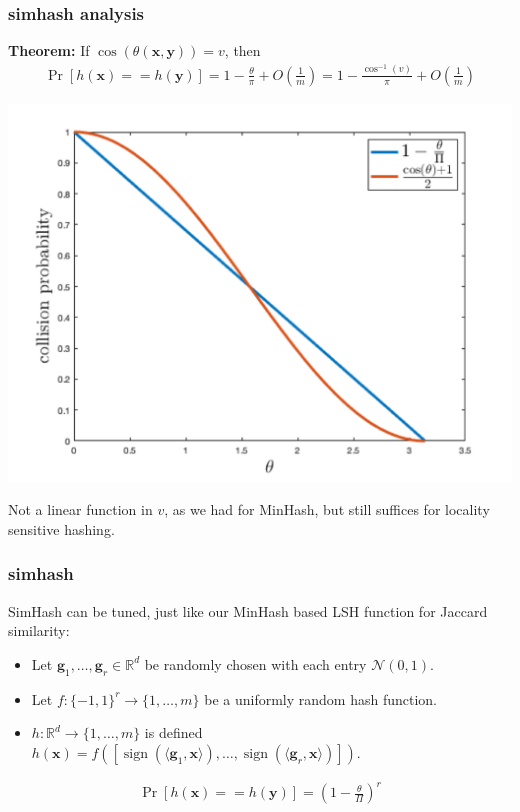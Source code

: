 \documentclass[compress]{beamer}
\newcommand{\bv}[1]{\mathbf{#1}}
\newcommand{\R}{\mathbb{R}}
\DeclareMathOperator{\sign}{sign}
\begin{document}
%		



\begin{frame}[t]
	\frametitle{simhash analysis}
	\textbf{Theorem:} If $\cos(\theta(\bv{x},\bv{y})) = v$, then 
	\begin{align*}
		\Pr[h(\bv{x}) == h(\bv{y})] = 1 - \frac{\theta}{\pi}  + O(\frac{1}{m})= 1 - \frac{\cos^{-1}(v)}{\pi} + O(\frac{1}{m})
	\end{align*}
	\begin{center}
		\includegraphics[width=.7\textwidth]{simhash_collision_prob.png}
	\end{center}
Not a linear function in $v$, as we had for MinHash, but still suffices for locality sensitive hashing. 
\end{frame}

\begin{frame}
	\frametitle{simhash}
	SimHash can be tuned, just like our MinHash based LSH function for Jaccard similarity:
	\begin{itemize}
		\item Let $\bv{g}_1,\ldots, \bv{g}_r \in \R^d$ be randomly chosen with each entry $\mathcal{N}(0,1)$. 
		\item Let $f: \{-1,1\}^r \rightarrow \{1,\ldots, m\}$ be a uniformly random hash function. 
		\item $h: \R^d \rightarrow \{1,\ldots, m\}$ is defined $h(\bv{x}) = f\left([\sign(\langle \bv{g}_1, \bv{x} \rangle),\ldots, \sign(\langle \bv{g}_r, \bv{x} \rangle)]\right)$.
	\end{itemize}
\begin{align*}
	\Pr[h(\bv{x}) == h(\bv{y})] = \left(1-\frac{\theta}{\Pi}\right)^r
\end{align*}
\end{frame}
\end{document}
